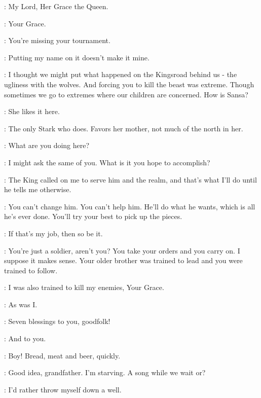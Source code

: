 
\JORY: My Lord, Her Grace the Queen. 

\NED: Your Grace. 


\CERSEI: You're missing your tournament. 

\NED: Putting my name on it doesn't make it mine. 

\CERSEI: I thought we might put what happened on the Kingsroad behind us - the ugliness with the wolves. And forcing you to kill the beast was extreme. Though sometimes we go to extremes where our children are concerned. How is Sansa? 

\NED: She likes it here. 

\CERSEI: The only Stark who does. Favors her mother, not much of the north in her. 

\NED: What are you doing here? 

\CERSEI: I might ask the same of you. What is it you hope to accomplish? 

\NED: The King called on me to serve him and the realm, and that's what I'll do until he tells me otherwise. 

\CERSEI: You can't change him. You can't help him. He'll do what he wants, which is all he's ever done. You'll try your best to pick up the pieces. 

\NED: If that's my job, then so be it. 

\CERSEI: You're just a soldier, aren't you? You take your orders and you carry on. I suppose it makes sense. Your older brother was trained to lead and you were trained to follow. 

\NED: I was also trained to kill my enemies, Your Grace. 

\CERSEI: As was I. 

\scene



\MARILLION: Seven blessings to you, goodfolk! 

\CATELYN: And to you. 

\RODRIK: Boy! Bread, meat and beer, quickly. 

\MARILLION: Good idea, grandfather. I'm starving. A song while we wait or? 

\RODRIK: I'd rather throw myself down a well. 

